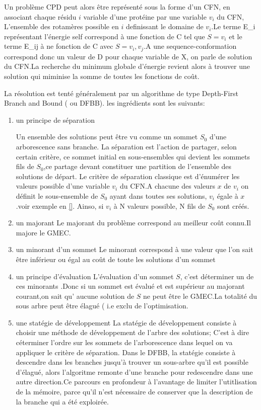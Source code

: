 Un problème CPD peut alors être représenté sous la forme d'un CFN, en associant chaque résidu $i$ variable d'une protéine par une variable $v_i$ du CFN, L'ensemble des rotamères possible en $i$ definissant le domaine de $v_i$.Le terme E_i représentant l'énergie \og self \fg correspond à une fonction de C tel que $S={v_i}$ et le terme E_{ij} à ne fonction de C avec $S={v_i,v_j}$.A une sequence-conformation correspond donc un valeur de D  pour chaque variable de X, on parle de solution du CFN.La recherche du minimum globale d'énergie revient alors à trouver une solution qui miminise la somme de toutes les fonctions de coût.
  
La résolution est tenté généralement par un algorithme de type  \og Depth-First Branch and Bound \fg ( ou DFBB).
les ingrédients sont les suivants:
\begin{enumerate}
\item un principe de séparation

Un ensemble des solutions peut être vu comme un sommet $S_0$ d'une arborescence sans branche.  
La séparation est l'action de partager, selon certain critère, ce sommet initial en sous-ensembles  qui devient les sommets fils de $S_0$,ce partage devant constituer une partition de l'ensemble des solutions de départ.
Le critère de séparation classique est d'énumérer les valeurs possible d'une variable $v_i$ du  CFN.A chacune des valeurs $x$ de $v_i$ on définit le sous-ensemble de $S_0$ ayant dans toutes ses solutions, $v_i$ égale à $x$.voir exemple en \ref{}. Ainso, si $v_i$ à N valeurs possible, N fils de $S_0$ sont créés.
\item un majorant
 Le majorant du problème correspond au meilleur coût connu.Il majore le GMEC.
\item un minorant d'un sommet
Le minorant correspond à une valeur que l'on sait être inférieur ou égal au coût de toute les solutions d'un sommet  
\item un principe d'évaluation
L'évaluation d'un sommet $S$, c'est déterminer un de ces minorants .Donc si un sommet est évalué et est supérieur au majorant courant,on sait qu' aucune solution de $S$ ne peut être le GMEC.La totalité du sous arbre peut être élagué ( i.e exclu de l'optimisation.  

\item une statégie de développement
La statégie de développement consiste à choisir une méthode de développement de l'arbre des solutions; C'est à dire céterminer l'ordre sur les sommets de l'arborescence dans lequel on va appliquer le critère de séparation.
Dans le DFBB, la statégie consiste à descendre dans les branches jusqu'à trouver un sous-arbre qu'il est possible d'élagué, alors l'algoritme remonte d'une branche pour redescendre dans une autre direction.Ce parcours en profondeur à l'avantage 
de limiter l'utitlisation de la mémoire, parce qu'il n'est nécessaire de conserver que la description de la branche qui a été exploirée.  
\end{enumerate}  



